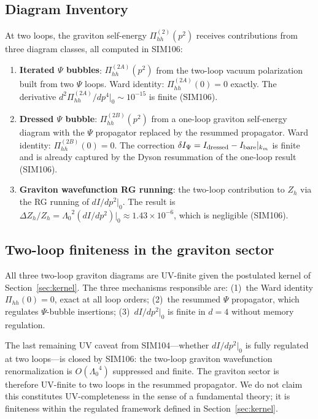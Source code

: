 \documentclass[12pt,a4paper]{article}
\newcommand{\Lz}{{\Lambda_0}}
\newcommand{\km}{{k_m}}
\newcommand{\Pih}{\Pi_{hh}}
\begin{document}
\subsection{Diagram Inventory}

At two loops, the graviton self-energy $\Pih^{(2)}(p^2)$ receives
contributions from three diagram classes, all computed in SIM106:

\begin{enumerate}
  \item \textbf{Iterated $\Psi$ bubbles}: $\Pih^{(2A)}(p^2)$ from
    the two-loop vacuum polarization built from two $\Psi$ loops.
    Ward identity: $\Pih^{(2A)}(0) = 0$ exactly. The derivative
    $d^2\Pih^{(2A)}/dp^4|_0 \sim 10^{-15}$ is finite (SIM106).

  \item \textbf{Dressed $\Psi$ bubble}: $\Pih^{(2B)}(p^2)$ from
    a one-loop graviton self-energy diagram with the $\Psi$ propagator
    replaced by the resummed propagator. Ward identity: $\Pih^{(2B)}(0) = 0$.
    The correction $\delta I_\Psi = I_{\rm dressed} - I_{\rm bare}|_{\km}$
    is finite and is already captured by the Dyson resummation of the
    one-loop result (SIM106).

  \item \textbf{Graviton wavefunction RG running}: the two-loop contribution
    to $Z_h$ via the RG running of $dI/dp^2|_0$. The result is
    $\Delta Z_h/Z_h = \Lz^2 (dI/dp^2)|_0 \approx 1.43\times10^{-6}$,
    which is negligible (SIM106).
\end{enumerate}

\subsection{Two-loop finiteness in the graviton sector}

All three two-loop graviton diagrams are UV-finite given the postulated
kernel of Section~\ref{sec:kernel}. The three mechanisms responsible are:
(1)~the Ward identity $\Pih(0) = 0$, exact at all loop orders;
(2)~the resummed $\Psi$ propagator, which regulates $\Psi$-bubble insertions;
(3)~$dI/dp^2|_0$ is finite in $d=4$ without memory regulation.

The last remaining UV caveat from SIM104---whether $dI/dp^2|_0$ is fully
regulated at two loops---is closed by SIM106: the two-loop graviton
wavefunction renormalization is $O(\Lz^4)$ suppressed and finite.
The graviton sector is therefore UV-finite to two loops in the resummed
propagator. We do not claim this constitutes UV-completeness in the sense of
a fundamental theory; it is finiteness within the regulated framework defined
in Section~\ref{sec:kernel}.
\end{document}
